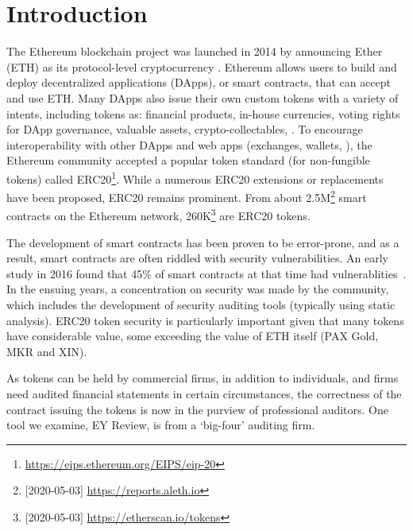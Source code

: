 
\section{Introduction}
\label{sect:introduction}

The Ethereum blockchain project was launched in 2014 by announcing Ether (ETH) as its protocol-level cryptocurrency \cite{EthGit,EIP150}. Ethereum allows users to build and deploy decentralized applications (DApps), or smart contracts, that can accept and use ETH. Many DApps also issue their own custom tokens with a variety of intents, including tokens as: financial products, in-house currencies, voting rights for DApp governance, valuable assets, crypto-collectables, \etc. To encourage interoperability with other DApps and web apps (exchanges, wallets, \etc), the Ethereum community accepted a popular token standard (for non-fungible tokens) called ERC20\footnote{\url{https://eips.ethereum.org/EIPS/eip-20}}. While a numerous ERC20 extensions or replacements have been proposed, ERC20 remains prominent. From about 2.5M\footnote{[2020-05-03] \url{https://reports.aleth.io}} smart contracts on the Ethereum network, 260K\footnote{[2020-05-03] \url{https://etherscan.io/tokens}} are ERC20 tokens.

The development of smart contracts has been proven to be error-prone, and as a result, smart contracts are often riddled with security vulnerabilities. An early study in 2016 found that 45\% of smart contracts at that time had vulnerablities~\cite{MakSm}. In the ensuing years, a concentration on security was made by the community, which includes the development of security auditing tools (typically using static analysis). ERC20 token security is particularly important given that many tokens have considerable value, some exceeding the value of ETH itself (\eg PAX Gold, MKR and XIN). 

As tokens can be held by commercial firms, in addition to individuals, and firms need audited financial statements in certain circumstances, the correctness of the contract issuing the tokens is now in the purview of professional auditors. One tool we examine, EY Review, is from a `big-four' auditing firm. 

